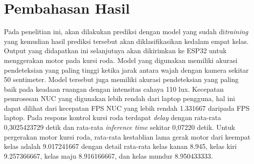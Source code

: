 \section{Pembahasan Hasil}
Pada penelitian ini, akan dilakukan prediksi dengan model yang sudah di\emph{training} yang kemudian hasil prediksi tersebut akan diklasifikasikan kedalam empat kelas. Output yang didapatkan ini selanjutnya akan dikirimkan ke ESP32 untuk menggerakan motor pada kursi roda. Model yang digunakan memiliki akurasi pendeteksian yang paling tinggi ketika jarak antara wajah dengan kamera sekitar 50 sentimeter. Model tersebut juga memiliki akurasi pendeteksian yang paling baik pada keadaan ruangan dengan intensitas cahaya 110 lux. Kecepatan pemrosesan NUC yang digunakan lebih rendah dari laptop pengguna, hal ini dapat dilihat dari kecepatan FPS NUC yang lebih rendah 1.331667 daripada FPS laptop. Pada respons kontrol kursi roda terdapat \emph{delay} dengan rata-rata 0,3025423729 detik dan rata-rata \emph{inference time} sekitar 0,07220 detik. Untuk pergerakan motor kursi roda, rata-rata kestablian lama gerak motor dari keempat kelas adalah 9.017241667 dengan detail rata-rata kelas kanan 8.945, kelas kiri 9.257366667, kelas maju 8.916166667, dan kelas mundur 8.950433333. 
